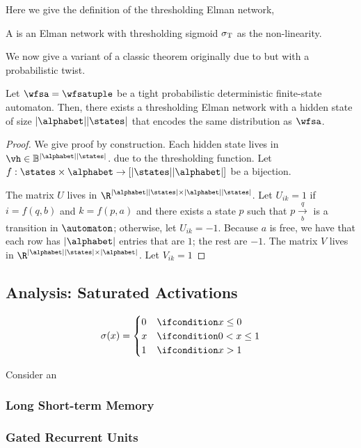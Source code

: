 Here we give the definition of the thresholding Elman network, 
\begin{definition}
A  is an Elman network with thresholding sigmoid $ \sigma_{\textnormal{T}}$ as the non-linearity. 
\end{definition}

We now give a variant of a classic theorem originally due to \citet{Minsky1954} but with a probabilistic twist.


\begin{theorem}
Let $\wfsa = \wfsatuple$ be a tight probabilistic deterministic finite-state automaton.
Then, there exists a thresholding Elman network with a hidden state of size $|\alphabet||\states|$ that encodes the same distribution as $\wfsa$.
\end{theorem}
\begin{proof}
We give proof by construction.
Each hidden state lives in $\vh \in \mathbb{B}^{|\alphabet||\states|}$.  due to the thresholding function.
Let $f : \states \times \alphabet \rightarrow [|\states||\alphabet|]$ be a bijection.

The matrix $U$ lives in $\R^{|\alphabet||\states| \times |\alphabet||\states|}$.
Let $U_{ik} = 1$ if $i = f(q, b)$ and $k = f(p, a)$ and there exists a state $p$ such that $p\xrightarrow[b]{q}$ is a transition in $\automaton$; otherwise, let $U_{ik} = -1$. 
Because $a$ is free, we have that each row has $|\alphabet|$ entries that are $1$; the rest are $-1$. 
The matrix $V$ lives in $\R^{|\alphabet||\states| \times |\alphabet|}$.
Let $V_{ik} = 1$ 



\end{proof}

\subsection{Analysis: Saturated Activations}



\begin{definition}
$$
\sigma(x)=
\begin{cases}
0 &  \ifcondition x  \le 0  \\
x &  \ifcondition 0 < x \le  1 \\
1 &  \ifcondition x  > 1 
\end{cases}
$$
\end{definition}


\begin{lemma}
Consider an 
\end{lemma}



\subsubsection{Long Short-term Memory}

\subsubsection{Gated Recurrent Units}